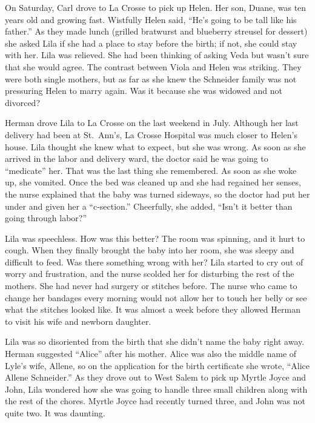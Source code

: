 \documentclass[
  american,
  letterpaper,
]{book}
\begin{document}
On Saturday, Carl drove to La Crosse to pick up Helen. Her son, Duane,
was ten years old and growing fast. Wistfully Helen said, ``He's going
to be tall like his father.'' As they made lunch (grilled bratwurst and
blueberry streusel for dessert) she asked Lila if she had a place to
stay before the birth; if not, she could stay with her. Lila was
relieved. She had been thinking of asking Veda but wasn't sure that she
would agree. The contrast between Viola and Helen was striking. They
were both single mothers, but as far as she knew the Schneider family
was not pressuring Helen to marry again. Was it because she was widowed
and not divorced?

Herman drove Lila to La Crosse on the last weekend in July. Although her
last delivery had been at St.~Ann's, La Crosse Hospital was much closer
to Helen's house. Lila thought she knew what to expect, but she was
wrong. As soon as she arrived in the labor and delivery ward, the doctor
said he was going to ``medicate'' her. That was the last thing she
remembered. As soon as she woke up, she vomited. Once the bed was
cleaned up and she had regained her senses, the nurse explained that the
baby was turned sideways, so the doctor had put her under and given her
a ``c-section.'' Cheerfully, she added, ``Isn't it better than going
through labor?''

Lila was speechless. How was this better? The room was spinning, and it
hurt to cough. When they finally brought the baby into her room, she was
sleepy and difficult to feed. Was there something wrong with her? Lila
started to cry out of worry and frustration, and the nurse scolded her
for disturbing the rest of the mothers. She had never had surgery or
stitches before. The nurse who came to change her bandages every morning
would not allow her to touch her belly or see what the stitches looked
like. It was almost a week before they allowed Herman to visit his wife
and newborn daughter.

Lila was so disoriented from the birth that she didn't name the baby
right away. Herman suggested ``Alice'' after his mother. Alice was also
the middle name of Lyle's wife, Allene, so on the application for the
birth certificate she wrote, ``Alice Allene Schneider.'' As they drove
out to West Salem to pick up Myrtle Joyce and John, Lila wondered how
she was going to handle three small children along with the rest of the
chores. Myrtle Joyce had recently turned three, and John was not quite
two. It was daunting.
\end{document}
